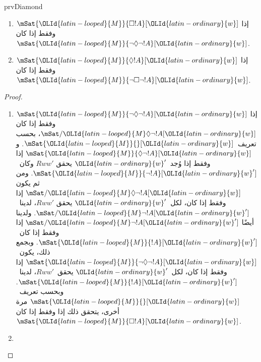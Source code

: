 \documentclass[../../../include/open-logic-section]{subfiles}
\begin{document}
\begin{tagblock}{prvDiamond}
\begin{prop}
  \begin{enumerate}
  \item $\mSat{{\OLId{latin-looped}{M}}}{\Box !A}[{\OLId{latin-ordinary}{w}}]$ إذا وفقط إذا كان
    $\mSat{{\OLId{latin-looped}{M}}}{\lnot\Diamond\lnot !A}[{\OLId{latin-ordinary}{w}}]$.
  \item $\mSat{{\OLId{latin-looped}{M}}}{\Diamond !A}[{\OLId{latin-ordinary}{w}}]$ إذا وفقط إذا كان
    $\mSat{{\OLId{latin-looped}{M}}}{\lnot\Box\lnot !A}[{\OLId{latin-ordinary}{w}}]$.
  \end{enumerate}
\end{prop}

\begin{proof}
  \begin{enumerate}
    \item $\mSat{{\OLId{latin-looped}{M}}}{\lnot\Diamond\lnot !A}[{\OLId{latin-ordinary}{w}}]$ إذا وفقط إذا كان
      $\mSat/{{\OLId{latin-looped}{M}}}{\Diamond\lnot !A}[{\OLId{latin-ordinary}{w}}]$، بحسب تعريف~$\mSat{{\OLId{latin-looped}{M}}}{}[{\OLId{latin-ordinary}{w}}]$.
      و$\mSat{{\OLId{latin-looped}{M}}}{\Diamond\lnot !A}[{\OLId{latin-ordinary}{w}}]$ إذا وفقط إذا وُجد~${\OLId{latin-ordinary}{w}}'$ يحقق
      $Rww'$ وكان~$\mSat{{\OLId{latin-looped}{M}}}{\lnot !A}[{\OLId{latin-ordinary}{w}}']$. ومن ثم يكون
      $\mSat/{{\OLId{latin-looped}{M}}}{\Diamond\lnot !A}[{\OLId{latin-ordinary}{w}}]$ إذا وفقط إذا كان، لكل~${\OLId{latin-ordinary}{w}}'$ يحقق
      $Rww'$، لدينا~$\mSat/{{\OLId{latin-looped}{M}}}{\lnot !A}[{\OLId{latin-ordinary}{w}}']$. ولدينا أيضًا
      $\mSat/{{\OLId{latin-looped}{M}}}{\lnot !A}[{\OLId{latin-ordinary}{w}}']$ إذا وفقط إذا كان~$\mSat{{\OLId{latin-looped}{M}}}{!A}[{\OLId{latin-ordinary}{w}}']$.
      وبجمع ذلك، يكون~$\mSat{{\OLId{latin-looped}{M}}}{\lnot\Diamond\lnot !A}[{\OLId{latin-ordinary}{w}}]$ إذا وفقط
      إذا كان، لكل~${\OLId{latin-ordinary}{w}}'$ يحقق~$Rww'$، لدينا~$\mSat{{\OLId{latin-looped}{M}}}{!A}[{\OLId{latin-ordinary}{w}}']$. وبحسب
      تعريف~$\mSat{{\OLId{latin-looped}{M}}}{}[{\OLId{latin-ordinary}{w}}]$ مرة أخرى، يتحقق ذلك إذا وفقط إذا كان
      $\mSat{{\OLId{latin-looped}{M}}}{\Box !A}[{\OLId{latin-ordinary}{w}}]$.
    \item {}
\end{enumerate}
\end{proof}
\end{tagblock}
\end{document}

